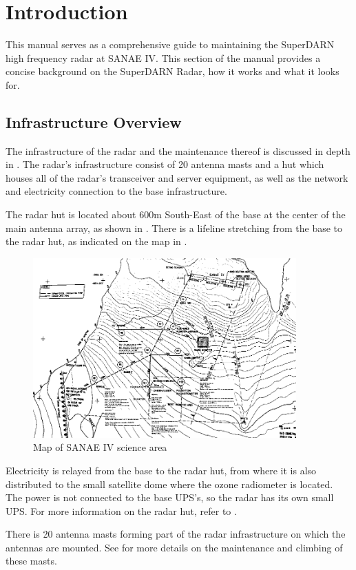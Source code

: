 \section{Introduction}
\label{sec:introduction}
This manual serves as a comprehensive guide to maintaining the SuperDARN high frequency radar at SANAE IV. This section of the manual provides a concise background on the SuperDARN Radar, how it works and what it looks for.


\subsection{Infrastructure Overview}
\label{subsec:intro_infra}
The infrastructure of the radar and the maintenance thereof is discussed in depth in . The radar's infrastructure consist of 20 antenna masts and a hut which houses all of the radar's transceiver and server equipment, as well as the network and electricity connection to the base infrastructure.
\par
The radar hut is located about 600m South-East of the base at the center of the main antenna array, as shown in . There is a lifeline stretching from the base to the radar hut, as indicated on the map in .

\vfill
\begin{figure}[H]
	\centering
	\includegraphics[width=0.9\textwidth]{images/introduction/map.bmp}
	\caption{Map of SANAE IV science area}
	\label{fig:intro_map}
\end{figure}
\vfill

Electricity is relayed from the base to the radar hut, from where it is also distributed to the small satellite dome where the ozone radiometer is located. The power is not connected to the base UPS's, so the radar has its own small UPS. For more information on the radar hut, refer to .
\par
There is 20 antenna masts forming part of the radar infrastructure on which the antennas are mounted. See  for more details on the maintenance and climbing of these masts.

